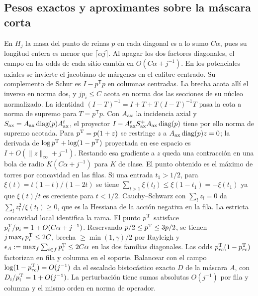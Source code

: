 \subsection{Pesos exactos y aproximantes sobre la máscara corta}
En \(H_j\) la masa del punto de reinas \(p\) en cada diagonal es a lo sumo \(C\alpha\),
pues su longitud entera es menor que \(\lceil\alpha j\rceil\). Al apagar los dos factores
diagonales, el campo en las odds de cada sitio cambia en \(O(C\alpha+j^{-1})\).
En los potenciales axiales se invierte el jacobiano de márgenes en el calibre centrado.
Su complemento de Schur es \(I-p^{\mathsf T}p\) en columnas centradas. La brecha acota
allí el inverso en norma dos, y \(jp_i\le C\) acota en norma dos las secciones de su
núcleo normalizado. La identidad
\((I-T)^{-1}=I+T+T(I-T)^{-1}T\) pasa la cota a norma de supremo para \(T=p^{\mathsf T}p\).
Con \(A_{\rm ax}\) la incidencia axial y \(S_{\rm ax}=A_{\rm ax}\operatorname{diag}(p)A_{\rm ax}^t\),
el proyector \(I-A_{\rm ax}^t S_{\rm ax}^+A_{\rm ax}\operatorname{diag}(p)\) tiene por ello norma
de supremo acotada. Para \(p^{\rm T}=p(1+z)\) se restringe \(z\) a
\(A_{\rm ax}\operatorname{diag}(p)z=0\); la derivada de \(\log p^{\rm T}+\log(1-p^{\rm T})\)
proyectada en ese espacio es \(I+O(\|z\|_\infty+j^{-1})\). Restando esa gradiente
a \(z\) queda una contracción en una bola de radio \(K(C\alpha+j^{-1})\) para \(K\) de clase.
El punto obtenido es el máximo de torres por concavidad en las filas. Si una entrada
\(t_1>1/2\), para \(\xi(t)=t(1-t)/(1-2t)\) se tiene
\(\sum_{l>1}\xi(t_l)\le\xi(1-t_1)=-\xi(t_1)\) ya que \(\xi(t)/t\) es creciente
para \(t<1/2\). Cauchy--Schwarz con \(\sum_l z_l=0\) da \(\sum_l z_l^2/\xi(t_l)\ge0\),
que es la Hessiana de la acción negativa en la fila. La estricta concavidad local
identifica la rama. El punto \(p^{\rm T}\) satisface
\(p^{\rm T}_i/p_i=1+O(C\alpha+j^{-1})\). Reservando \(p/2\le p^{\rm T}\le3p/2\), se tienen
\(j\max_i p^{\rm T}_i\le2C\), brecha \(\ge\min(1,\gamma)/2\) por Rayleigh y
\(\epsilon_A:=\max_f\sum_{i\in f}p^{\rm T}_i\le2C\alpha\) en las dos familias diagonales.
Las odds \(p^{\rm T}_{rc}(1-p^{\rm T}_{rc})\) factorizan en fila y columna en el soporte. Balancear
con el campo \(\log(1-p^{\rm T}_{rc})=O(j^{-1})\) da el escalado bistocástico exacto \(D\)
de la máscara \(A\), con \(D_i/p^{\rm T}_i=1+O(j^{-1})\). La perturbación tiene sumas absolutas
\(O(j^{-1})\) por fila y columna y el mismo orden en norma de operador.


